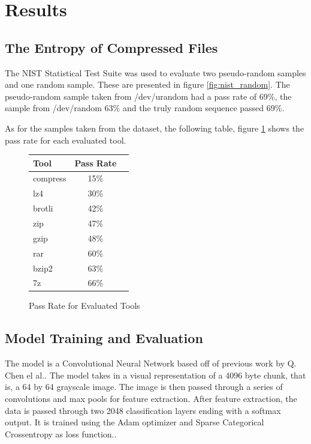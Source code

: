 \documentclass[conference]{IEEEtran}
\begin{document}

\section{Results}

\subsection{The Entropy of Compressed Files}

The NIST Statistical Test Suite was used to evaluate two pseudo-random samples and one random sample. These are presented in figure \ref{fig:nist_random}. The pseudo-random sample taken from /dev/urandom had a pass rate of 69\%, the sample from /dev/random 63\% and the truly random sequence passed 69\%.

As for the samples taken from the dataset, the following table, figure \ref{fig:nist_samples} shows the pass rate for each evaluated tool.

\begin{figure}[H]
    \centering
    \begin{tabular}{l|c|c}
        Tool & Pass Rate\\ \hline
        compress & 15\%\\
        lz4 & 30\%\\
        brotli & 42\%\\
        zip & 47\% \\
        gzip & 48\%\\
        rar & 60\%\\
        bzip2 & 63\%\\
        7z & 66\%\\
    \end{tabular}
    \caption{Pass Rate for Evaluated Tools}
    \label{fig:nist_samples}
\end{figure}

\subsection{Model Training and Evaluation}
\label{result:model}

The model is a Convolutional Neural Network based off of previous work by Q. Chen el al.. The model takes in a visual representation of a 4096 byte chunk, that is, a 64 by 64 grayscale image. The image is then passed through a series of convolutions and max pools for feature extraction. After feature extraction, the data is passed through two 2048 classification layers ending with a softmax output. It is trained using the Adam optimizer and Sparse Categorical Crossentropy as loss function.\cite{chen2018}.
\end{document}
